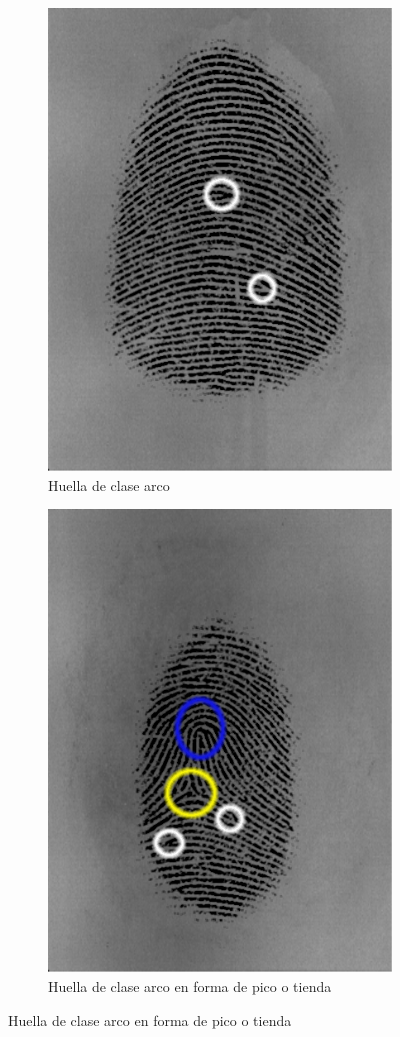 \documentclass[10pt,a4paper]{article}
\begin{document}
\begin{figure}[h!]
\centering
\begin{subfigure}{.5\textwidth}
  \centering
  \includegraphics[width=.7\linewidth]{1/arch.png}
  \caption{Huella de clase arco}
  \label{fig:arch}
\end{subfigure}%
\begin{subfigure}{.5\textwidth}
  \centering
  \includegraphics[width=.7\linewidth]{1/tented_arch.png}
  \caption{Huella de clase arco en forma de pico o tienda}
  \label{fig:tented_arch}
\end{subfigure}


\end{figure}
\end{document}
